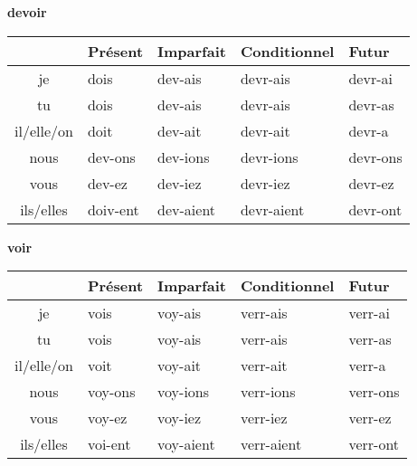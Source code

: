 \renewcommand{\stemPresent}{dev}
\renewcommand{\stemFutur}{devr}
\begin{center}
\textbf{devoir}
\vskip 0.1cm
\begin{tabular}{|c||L{3cm}|L{3cm}|L{3cm}|L{3cm}|}
\hline
& Pr\'esent & Imparfait & Conditionnel & Futur \\
\hline\hline
je           &	{\color{red}doi}s 	&	\stemPresent-ais	&	\stemFutur-ais	 &	\stemFutur-ai	\\
tu           &	{\color{red}doi}s	&	\stemPresent-ais	&	\stemFutur-ais	&	\stemFutur-as	\\
il/elle/on &	{\color{red}doi}t		&	\stemPresent-ait	&	\stemFutur-ait	&	\stemFutur-a	\\
nous      &	\stemPresent-ons	&	\stemPresent-ions	&	\stemFutur-ions	&	\stemFutur-ons	\\
vous      &	\stemPresent-ez	&	\stemPresent-iez	&	\stemFutur-iez		&	\stemFutur-ez	\\
ils/elles  &	{\color{red}doiv}-ent	&	\stemPresent-aient	&	\stemFutur-aient	&	\stemFutur-ont	\\
\hline
\end{tabular}
\end{center}

\renewcommand{\stemPresent}{voy}
\renewcommand{\stemFutur}{verr}
\begin{center}
\textbf{voir}
\vskip 0.1cm
\begin{tabular}{|c||L{3cm}|L{3cm}|L{3cm}|L{3cm}|}
\hline
& Pr\'esent & Imparfait & Conditionnel & Futur \\
\hline\hline
je           &	{\color{red}voi}s 	&	\stemPresent-ais	&	\stemFutur-ais	 &	\stemFutur-ai	\\
tu           &	{\color{red}voi}s	&	\stemPresent-ais	&	\stemFutur-ais	&	\stemFutur-as	\\
il/elle/on &	{\color{red}voi}t		&	\stemPresent-ait	&	\stemFutur-ait	&	\stemFutur-a	\\
nous      &	\stemPresent-ons	&	\stemPresent-ions	&	\stemFutur-ions	&	\stemFutur-ons	\\
vous      &	\stemPresent-ez	&	\stemPresent-iez	&	\stemFutur-iez		&	\stemFutur-ez	\\
ils/elles  &	{\color{red}voi}-ent	&	\stemPresent-aient	&	\stemFutur-aient	&	\stemFutur-ont	\\
\hline
\end{tabular}
\end{center}

